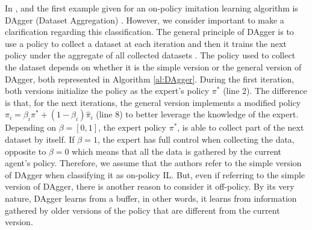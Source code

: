 In \cite{DBLP:journals/corr/LaskeyLHLMFG17}, \cite{OtherLaskeydefinitions:2019} and \cite{Osa:2018} the first example given for an on-policy imitation learning algorithm is DAgger (Dataset  Aggregation) \cite{DAgger-Ross:2011}. However, we consider important to make a clarification regarding this classification. The general principle of DAgger is to use a policy to collect a dataset at each iteration and then it trains the next policy under the aggregate of all collected datasets \cite{DAgger-Ross:2011}. The policy used to collect the dataset depends on whether it is the simple version or the general version of DAgger, both represented in Algorithm \ref{al:DAgger}. During the first iteration, both versions initialize the policy as the expert’s policy $\pi^*$ (line 2). The difference is that, for the next iterations, the general version implements a modified policy $\pi_i=\beta_i\pi^*+ (1−\beta_i)\hat{\pi}_i$ (line 8) to better leverage the knowledge of the expert. Depending on $\beta = [0,1]$, the expert policy $\pi^*$, is able to collect part of the next dataset by itself. If $\beta = 1$, the expert has full control when collecting the data, opposite to $\beta=0$  which means that all the data is gathered by the current agent's policy.
Therefore, we assume that the authors refer to the simple version of DAgger when classifying it as on-policy IL. But, even if referring to the simple version of DAgger, there is another reason to consider it off-policy. By its very nature, DAgger learns from a buffer, in other words, it learns from information gathered by older versions of the policy that are different from the current version.







